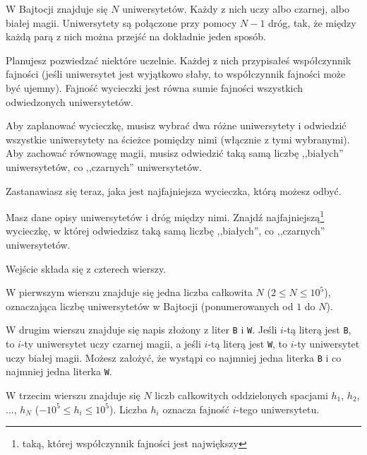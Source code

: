 

\usepackage[utf8]{inputenc}
\usepackage[T1]{fontenc}
\usepackage[polish]{babel}
\usepackage{polski}





W Bajtocji znajduje się $N$ uniwersytetów.
Każdy z nich uczy albo czarnej, albo białej magii.
Uniwersytety są połączone przy pomocy $N-1$ dróg,
	tak, że między każdą parą z nich można przejść na dokładnie jeden sposób.

Planujesz pozwiedzać niektóre uczelnie.
Każdej z nich przypisałeś współczynnik fajności
	(jeśli uniwersytet jest wyjątkowo słaby, to współczynnik fajności może być ujemny).
Fajność wycieczki jest równa sumie fajności wszystkich odwiedzonych uniwersytetów.

Aby zaplanować wycieczkę, musisz wybrać dwa różne uniwersytety i odwiedzić wszystkie uniwersytety
	na ścieżce pomiędzy nimi (włącznie z tymi wybranymi).
Aby zachować równowagę magii, musisz odwiedzić taką samą liczbę ,,białych'' uniwersytetów,
	co ,,czarnych'' uniwersytetów.

Zastanawiasz się teraz, jaka jest najfajniejsza wycieczka, którą możesz odbyć.


Masz dane opisy uniwersytetów i dróg między nimi.
Znajdź najfajniejszą\footnote{taką, której współczynnik fajności jest największy}
	wycieczkę, w której odwiedzisz taką samą liczbę ,,białych'', co ,,czarnych'' uniwersytetów.


Wejście składa się z czterech wierszy.

W pierwszym wierszu znajduje się jedna liczba całkowita $N$ ($2 \le N \le 10^5$),
	oznaczająca liczbę uniwersytetów w Bajtocji (ponumerowanych od $1$ do $N$).

W drugim wierszu znajduje się napis złożony z liter \texttt{B} i \texttt{W}.
Jeśli $i$-tą literą jest \texttt{B}, to $i$-ty uniwersytet uczy czarnej magii,
	a jeśli $i$-tą literą jest \texttt{W}, to $i$-ty uniwersytet uczy białej magii.
Możesz założyć, że wystąpi co najmniej jedna literka \texttt{B} i co najmniej jedna literka \texttt{W}.

W trzecim wierszu znajduje się $N$ liczb całkowitych oddzielonych spacjami $h_1$, $h_2$, $\ldots$, $h_N$
	($-10^5 \le h_i \le 10^5$).
Liczba $h_i$ oznacza fajność $i$-tego uniwersytetu.

